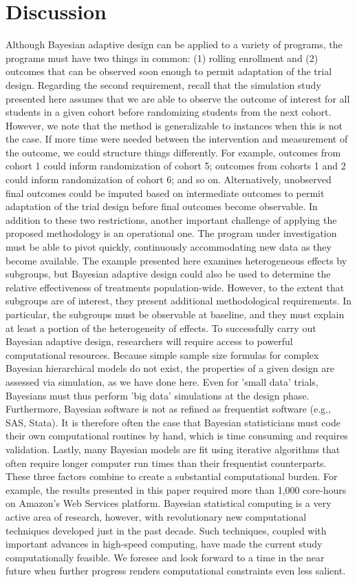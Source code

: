 \documentclass{acm_proc_article-sp}
\begin{document}
\section{Discussion}
Although Bayesian adaptive design can be applied to a variety of programs, the programs must have two things in common: (1) rolling enrollment and (2) outcomes that can be observed soon enough to permit adaptation of the trial design. Regarding the second requirement, recall that the simulation study presented here assumes that we are able to observe the outcome of interest for all students in a given cohort before randomizing students from the next cohort. However, we note that the method is generalizable to instances when this is not the case. If more time were needed between the intervention and measurement of the outcome, we could structure things differently. For example, outcomes from cohort 1 could inform randomization of cohort 5; outcomes from cohorts 1 and 2 could inform randomization of cohort 6; and so on. Alternatively, unobserved final outcomes could be imputed based on intermediate outcomes to permit adaptation of the trial design before final outcomes become observable.
In addition to these two restrictions, another important challenge of applying the proposed methodology is an operational one. The program under investigation must be able to pivot quickly, continuously accommodating new data as they become available. 
The example presented here examines heterogeneous effects by subgroups, but Bayesian adaptive design could also be used to determine the relative effectiveness of treatments population-wide. However, to the extent that subgroups are of interest, they present additional methodological requirements. In particular, the subgroups must be observable at baseline, and they must explain at least a portion of the heterogeneity of effects.
To successfully carry out Bayesian adaptive design, researchers will require access to powerful computational resources. Because simple sample size formulas for complex Bayesian hierarchical models do not exist, the properties of a given design are assessed via simulation, as we have done here. Even for 'small data' trials, Bayesians must thus perform 'big data' simulations at the design phase. Furthermore, Bayesian software is not as refined as frequentist software (e.g., SAS, Stata). It is therefore often the case that Bayesian statisticians must code their own computational routines by hand, which is time consuming and requires validation. Lastly, many Bayesian models are fit using iterative algorithms that often require longer computer run times than their frequentist counterparts. These three factors combine to create a substantial computational burden. For example, the results presented in this paper required more than 1,000 core-hours on Amazon's Web Services platform. 
Bayesian statistical computing is a very active area of research, however, with revolutionary new computational techniques developed just in the past decade. Such techniques, coupled with important advances in high-speed computing, have made the current study computationally feasible. We foresee and look forward to a time in the near future when further progress renders computational constraints even less salient.
\end{document}
